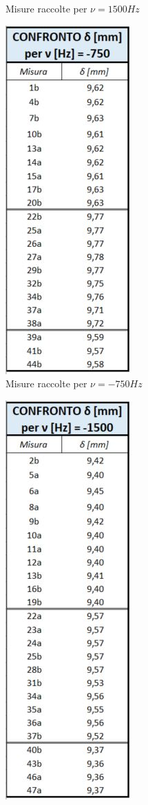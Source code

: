 \documentclass{article}
\begin{document}
\begin{figure}[h]
\begin{subfigure}[h]{0.2\textwidth}
        \caption{Misure raccolte per $\nu=1500Hz$}
        \label{Tab_1500}
    \end{subfigure}
    \hfill
    \begin{subfigure}[h]{0.2\linewidth}
        \centering
        \includegraphics{Coerenza_T3.JPG}
        \caption{Misure raccolte per $\nu=-750Hz$}
        \label{Tab_-750}        
    \end{subfigure}
    \hfill
    \begin{subfigure}[h]{0.2\linewidth}
        \centering
        \includegraphics{Coerenza_T4.JPG}

\end{subfigure}
\end{figure}
\end{document}
